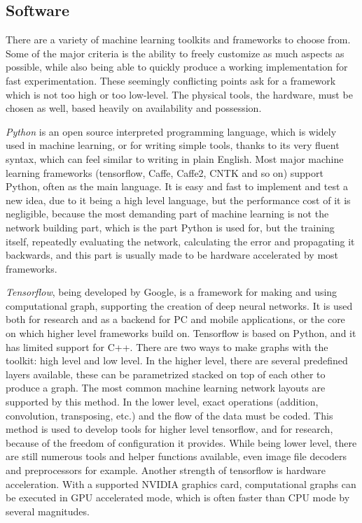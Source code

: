\documentclass[12pt]{report}
\begin{document}
\subsection{Software}
There are a variety of machine learning toolkits and frameworks to choose from. Some of the major criteria is the ability to freely customize as much aspects as possible, while also being able to quickly produce a working implementation for fast experimentation. These seemingly conflicting points ask for a framework which is not too high or too low-level. The physical tools, the hardware, must be chosen as well, based heavily on availability and possession.\par
\textit{Python} is an open source interpreted programming language, which is widely used in machine learning, or for writing simple tools, thanks to its very fluent syntax, which can feel similar to writing in plain English. Most major machine learning frameworks (tensorflow, Caffe, Caffe2, CNTK and so on) support Python, often as the main language. It is easy and fast to implement and test a new idea, due to it being a high level language, but the performance cost of it is negligible, because the most demanding part of machine learning is not the network building part, which is the part Python is used for, but the training itself, repeatedly evaluating the network, calculating the error and propagating it backwards, and this part is usually made to be hardware accelerated by most frameworks.\par
\textit{Tensorflow}, being developed by Google, is a framework for making and using computational graph, supporting the creation of deep neural networks. It is used both for research and as a backend for PC and mobile applications, or the core on which higher level frameworks build on. Tensorflow is based on Python, and it has limited support for C++. There are two ways to make graphs with the toolkit: high level and low level. In the higher level, there are several predefined layers available, these can be parametrized stacked on top of each other to produce a graph. The most common machine learning network layouts are supported by this method. In the lower level, exact operations (addition, convolution, transposing, etc.) and the flow of the data must be coded. This method is used to develop tools for higher level tensorflow, and for research, because of the freedom of configuration it provides. While being lower level, there are still numerous tools and helper functions available, even image file decoders and preprocessors for example. Another strength of tensorflow is hardware acceleration. With a supported NVIDIA graphics card, computational graphs can be executed in GPU accelerated mode, which is often faster than CPU mode by several magnitudes.\par
\end{document}
